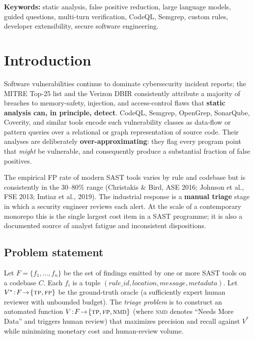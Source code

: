 \documentclass[11pt,a4paper]{article}
\begin{document}
\medskip
\noindent\textbf{Keywords:} static analysis, false positive reduction,
large language models, guided questions, multi-turn verification,
CodeQL, Semgrep, custom rules, developer extensibility, secure software
engineering.

\section{Introduction}
\label{sec:intro}

Software vulnerabilities continue to dominate cybersecurity incident
reports; the MITRE Top-25 list and the Verizon DBIR consistently
attribute a majority of breaches to memory-safety, injection, and
access-control flaws that \textbf{static analysis can, in principle,
detect}. CodeQL, Semgrep, OpenGrep, SonarQube, Coverity, and similar
tools encode such vulnerability classes as data-flow or pattern queries
over a relational or graph representation of source code. Their
analyses are deliberately \textbf{over-approximating}: they flag every
program point that \emph{might} be vulnerable, and consequently produce
a substantial fraction of false positives.

The empirical FP rate of modern SAST tools varies by rule and codebase
but is consistently in the 30--80\% range (Christakis \& Bird, ASE
2016; Johnson et al., FSE 2013; Imtiaz et al., 2019). The
industrial response is a \textbf{manual triage} stage in which a
security engineer reviews each alert. At the scale of a contemporary
monorepo this is the single largest cost item in a SAST programme; it
is also a documented source of analyst fatigue and inconsistent
dispositions.

\subsection{Problem statement}

Let $F = \{f_1, \ldots, f_n\}$ be the set of findings emitted by one or
more SAST tools on a codebase $C$. Each $f_i$ is a tuple
$(\textit{rule\_id}, \textit{location}, \textit{message},
\textit{metadata})$. Let
$V^{*}\!:\!F\!\to\!\{\textsc{tp},\textsc{fp}\}$ be the ground-truth
oracle (a sufficiently expert human reviewer with unbounded budget).
The \emph{triage problem} is to construct an automated function
$V\!:\!F\!\to\!\{\textsc{tp},\textsc{fp},\textsc{nmd}\}$ (where
\textsc{nmd} denotes ``Needs More Data'' and triggers human review)
that maximizes precision and recall against $V^{*}$ while minimizing
monetary cost and human-review volume.
\end{document}
